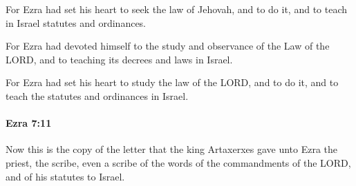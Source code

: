 			\begin{versebox}
					\item[BHS] 
					\item[LXX] 
					\item[ASV] For Ezra had set his heart to seek the law of Jehovah, and to do it, and to teach in Israel statutes and ordinances.
					\item[NIV] For Ezra had devoted himself to the study and observance of the Law of the LORD, and to teaching its decrees and laws in Israel.
					\item[NRSV] For Ezra had set his heart to study the law of the LORD, and to do it, and to teach the statutes and ordinances in Israel.
			\end{versebox}

		\paragraph{Ezra 7:11} %
			\label{EZRA-7-11}

			Now this is the copy of the letter that the king Artaxerxes gave unto Ezra the priest, the scribe, even a scribe of the words of the commandments of the LORD, and of his statutes to Israel.

